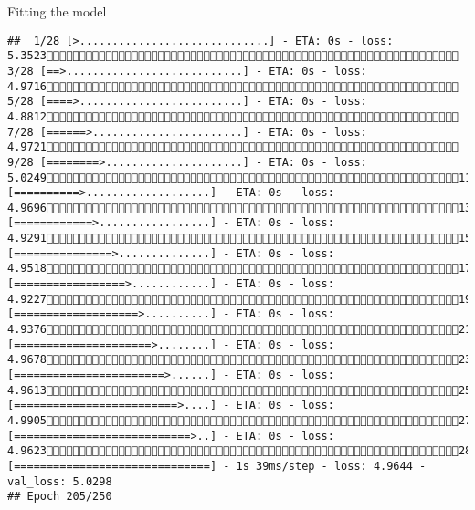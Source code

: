 \documentclass[
  ignorenonframetext,
]{beamer}
\begin{document}
\begin{frame}[fragile]{Fitting the model}
\begin{verbatim}
##  1/28 [>.............................] - ETA: 0s - loss: 5.3523 3/28 [==>...........................] - ETA: 0s - loss: 4.9716 5/28 [====>.........................] - ETA: 0s - loss: 4.8812 7/28 [======>.......................] - ETA: 0s - loss: 4.9721 9/28 [========>.....................] - ETA: 0s - loss: 5.024911/28 [==========>...................] - ETA: 0s - loss: 4.969613/28 [============>.................] - ETA: 0s - loss: 4.929115/28 [===============>..............] - ETA: 0s - loss: 4.951817/28 [=================>............] - ETA: 0s - loss: 4.922719/28 [===================>..........] - ETA: 0s - loss: 4.937621/28 [=====================>........] - ETA: 0s - loss: 4.967823/28 [=======================>......] - ETA: 0s - loss: 4.961325/28 [=========================>....] - ETA: 0s - loss: 4.990527/28 [===========================>..] - ETA: 0s - loss: 4.962328/28 [==============================] - 1s 39ms/step - loss: 4.9644 - val_loss: 5.0298
## Epoch 205/250

\end{verbatim}
\end{frame}
\end{document}
